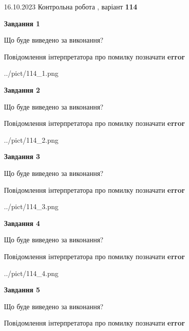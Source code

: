 \documentclass[12pt, ukrainian]{article}
\begin{document}
{\Large{16.10.2023 Контрольна робота , варіант  \No \textbf { 114 }\par}}
{
\begin {large}
{\begin {center}\textbf{Завдання 1}\end {center}}\par
Що буде виведено за виконання? \par
Повідомлення інтерпретатора про помилку позначати \textbf{error}

\begin{center}
	{../pict/114_1.png}
\end{center}
\newpage

{\begin {center}\textbf{Завдання 2}\end {center}}\par
Що буде виведено за виконання? \par
Повідомлення інтерпретатора про помилку позначати \textbf{error}

\begin{center}
	{../pict/114_2.png}
\end{center}
\newpage

{\begin {center}\textbf{Завдання 3}\end {center}}\par
Що буде виведено за виконання? \par
Повідомлення інтерпретатора про помилку позначати \textbf{error}

\begin{center}
	{../pict/114_3.png}
\end{center}
\newpage

{\begin {center}\textbf{Завдання 4}\end {center}}\par
Що буде виведено за виконання? \par
Повідомлення інтерпретатора про помилку позначати \textbf{error}

\begin{center}
	{../pict/114_4.png}
\end{center}
\newpage

{\begin {center}\textbf{Завдання 5}\end {center}}\par
Що буде виведено за виконання? \par
Повідомлення інтерпретатора про помилку позначати \textbf{error}


\end{large}}
\end{document}
